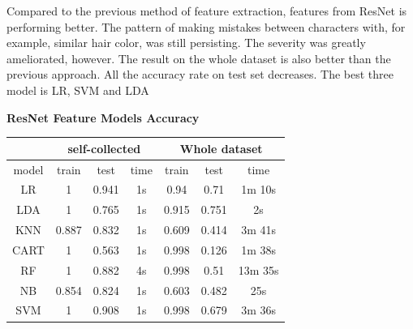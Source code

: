 \documentclass[11.5pt]{article}
\begin{document}
\begin{enumerate}
\begin{itemize}
            \vspace{3mm}
            \begin{minipage}{0.3\textwidth}
                Compared to the previous method of feature extraction, features from ResNet is performing better.
                The pattern of making mistakes between characters with, for example, similar hair color, was still persisting.
                The severity was greatly ameliorated, however.
                The result on the whole dataset is also better than the previous approach.
                All the accuracy rate on test set decreases.
                The best three model is LR, SVM and LDA
            \end{minipage}
            \begin{minipage}{0.5\textwidth}
                \begin{center}
                    \textbf{ResNet Feature Models Accuracy} 
                \end{center}
                    \begin{tabular}{|c|c|c|c|c|c|c|}
                        \hline
                            & \multicolumn{3}{|c|}{self-collected} & \multicolumn{3}{|c|}{Whole dataset} \\ \hline
                        model & train & test & time & train & test & time \\ \hline
                        LR & 1 & 0.941 & 1s & 0.94 & 0.71 & 1m 10s \\ \hline
                        LDA  & 1 & 0.765 & 1s & 0.915 & 0.751 & 2s \\ \hline
                        KNN & 0.887 & 0.832 & 1s & 0.609 & 0.414 & 3m 41s \\ \hline
                        CART & 1 & 0.563 & 1s & 0.998 & 0.126 & 1m 38s \\ \hline
                        RF & 1 & 0.882 & 4s & 0.998 & 0.51 & 13m 35s\\ \hline
                        NB & 0.854 & 0.824 & 1s & 0.603 & 0.482 & 25s \\ \hline
                        SVM  & 1 & 0.908 & 1s & 0.998 & 0.679 & 3m 36s \\ \hline
                    \end{tabular}
            \end{minipage}
            

\end{itemize}
\end{enumerate}
\end{document}
